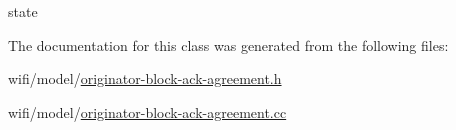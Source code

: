 state 



The documentation for this class was generated from the following files\+:\begin{DoxyCompactItemize}
\item 
wifi/model/\hyperlink{originator-block-ack-agreement_8h}{originator-\/block-\/ack-\/agreement.\+h}\item 
wifi/model/\hyperlink{originator-block-ack-agreement_8cc}{originator-\/block-\/ack-\/agreement.\+cc}\end{DoxyCompactItemize}
